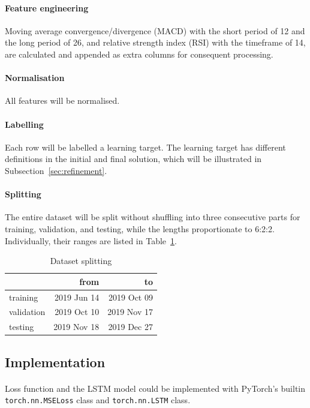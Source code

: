 \documentclass[12pt, letterpaper]{article}
\begin{document}
\paragraph{Feature engineering} Moving average convergence/divergence (MACD) with the short period of 12 and the long period of 26, and relative strength index (RSI) with the timeframe of 14, are calculated and appended as extra columns for consequent processing.

\paragraph{Normalisation} All features will be normalised.

\paragraph{Labelling} Each row will be labelled a learning target. The learning target has different definitions in the initial and final solution, which will be illustrated in Subsection~\ref{sec:refinement}.

\paragraph{Splitting} The entire dataset will be split without shuffling into three consecutive parts for training, validation, and testing, while the lengths proportionate to 6:2:2. Individually, their ranges are listed in Table~\ref{table:split}.

\begin{table}
    \centering
    \begin{tabular}{lrr}
        \toprule
                   &        from &          to \\
        \midrule
        training   & 2019 Jun 14 & 2019 Oct 09 \\
        validation & 2019 Oct 10 & 2019 Nov 17 \\
        testing    & 2019 Nov 18 & 2019 Dec 27 \\
        \bottomrule
    \end{tabular}
    \caption{Dataset splitting}%
    \label{table:split}
\end{table}

\subsection{Implementation}

\paragraph{}
Loss function and the LSTM model could be implemented with PyTorch's builtin \texttt{torch.nn.MSELoss} class and \texttt{torch.nn.LSTM} class.
\end{document}
